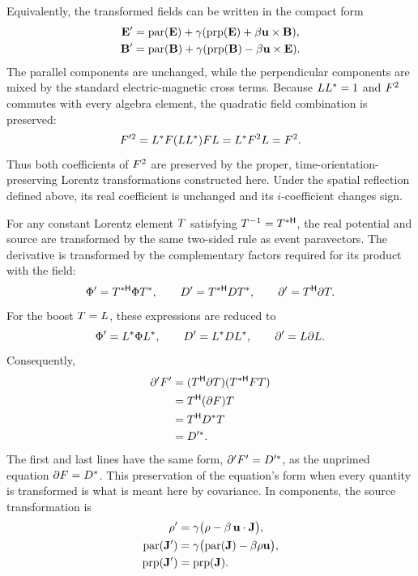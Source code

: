 Equivalently, the transformed fields can be written in the compact form
\begin{align*}
\mathbf{E} ' &= \operatorname{par}(\mathbf{E}) + \gamma ( \operatorname{prp}(\mathbf{E}) + \beta \mathbf{u} \times \mathbf{B} ), \\
\mathbf{B} ' &= \operatorname{par}(\mathbf{B}) + \gamma ( \operatorname{prp}(\mathbf{B}) - \beta \mathbf{u} \times \mathbf{E} ).
\end{align*}
The parallel components are unchanged, while the perpendicular components are mixed by the standard electric-magnetic cross terms.
Because \(LL^*=1\) and \(F^2\) commutes with every algebra
element, the quadratic field combination is preserved:
\begin{equation*}
F'^2=L^*F(LL^*)FL
=L^*F^2L=F^2.
\end{equation*}
Thus both coefficients of \(F^2\) are preserved by the proper,
time-orientation-preserving Lorentz transformations constructed here. Under
the spatial reflection defined
above, its real coefficient is unchanged and its \(i\)-coefficient changes
sign.

For any constant Lorentz element \(T\) satisfying
\(T^{-1}=T^{*\mathsf H}\), the real potential and source are
transformed by the same two-sided rule as event paravectors. The derivative
is transformed by the complementary factors required for its product with
the field:
\begin{equation*}
\Phi'=T^{*\mathsf H}\Phi T^*,
\qquad
D'=T^{*\mathsf H}DT^*,
\qquad
\partial'=T^{\mathsf H}\partial T.
\end{equation*}
For the boost \(T=L\), these expressions are reduced to
\[
\Phi'=L^*\Phi L^*,
\qquad
D'=L^*DL^*,
\qquad
\partial'=L\partial L.
\]
Consequently,
\begin{align*}
\partial'F'
&=(T^{\mathsf H}\partial T)
(T^{*\mathsf H}FT)\notag\\
&=T^{\mathsf H}(\partial F)T\notag\\
&=T^{\mathsf H}D^*T\notag\\
&=D'^*.
\end{align*}
The first and last lines have the same form,
\(\partial'F'=D'^*\), as the unprimed equation
\(\partial F=D^*\). This preservation of the equation's form
when every quantity is transformed is what is meant here by covariance. In
components, the source transformation is
\begin{align*}
\rho'&=\gamma\bigl(\rho-\beta\,\mathbf{u}\cdot\mathbf{J}\bigr),\\
\operatorname{par}(\mathbf{J}')
&=\gamma\bigl(\operatorname{par}(\mathbf{J})-\beta\rho\mathbf{u}\bigr),\\
\operatorname{prp}(\mathbf{J}')&=\operatorname{prp}(\mathbf{J}).
\end{align*}

